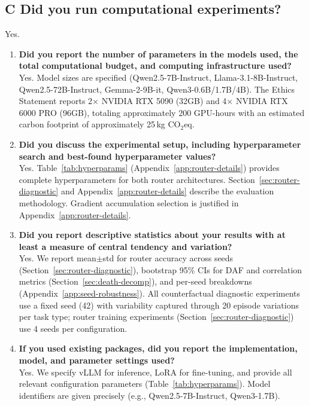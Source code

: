 \subsection*{C \quad Did you run computational experiments?}

Yes.

\begin{enumerate}
\item[\textbf{C1.}] \textbf{Did you report the number of parameters in the models used, the total computational budget, and computing infrastructure used?}\\
Yes. Model sizes are specified (Qwen2.5-7B-Instruct, Llama-3.1-8B-Instruct, Qwen2.5-72B-Instruct, Gemma-2-9B-it, Qwen3-0.6B/1.7B/4B). The Ethics Statement reports 2$\times$ NVIDIA RTX 5090 (32GB) and 4$\times$ NVIDIA RTX 6000 PRO (96GB), totaling approximately 200 GPU-hours with an estimated carbon footprint of approximately 25\,kg CO$_2$eq.

\item[\textbf{C2.}] \textbf{Did you discuss the experimental setup, including hyperparameter search and best-found hyperparameter values?}\\
Yes. Table~\ref{tab:hyperparams} (Appendix~\ref{app:router-details}) provides complete hyperparameters for both router architectures. Section~\ref{sec:router-diagnostic} and Appendix~\ref{app:router-details} describe the evaluation methodology. Gradient accumulation selection is justified in Appendix~\ref{app:router-details}.

\item[\textbf{C3.}] \textbf{Did you report descriptive statistics about your results with at least a measure of central tendency and variation?}\\
Yes. We report mean$\pm$std for router accuracy across seeds (Section~\ref{sec:router-diagnostic}), bootstrap 95\% CIs for DAF and correlation metrics (Section~\ref{sec:death-decomp}), and per-seed breakdowns (Appendix~\ref{app:seed-robustness}). All counterfactual diagnostic experiments use a fixed seed (42) with variability captured through 20 episode variations per task type; router training experiments (Section~\ref{sec:router-diagnostic}) use 4 seeds per configuration.

\item[\textbf{C4.}] \textbf{If you used existing packages, did you report the implementation, model, and parameter settings used?}\\
Yes. We specify vLLM for inference, LoRA for fine-tuning, and provide all relevant configuration parameters (Table~\ref{tab:hyperparams}). Model identifiers are given precisely (e.g., Qwen2.5-7B-Instruct, Qwen3-1.7B).
\end{enumerate}

